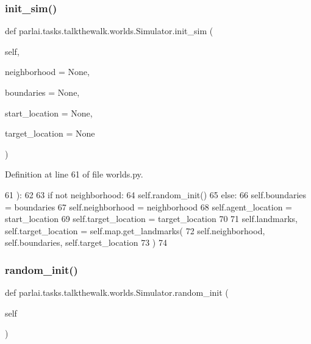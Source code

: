 \subsubsection{\texorpdfstring{init\+\_\+sim()}{init\_sim()}}
{\footnotesize\ttfamily def parlai.\+tasks.\+talkthewalk.\+worlds.\+Simulator.\+init\+\_\+sim (\begin{DoxyParamCaption}\item[{}]{self,  }\item[{}]{neighborhood = {\ttfamily None},  }\item[{}]{boundaries = {\ttfamily None},  }\item[{}]{start\+\_\+location = {\ttfamily None},  }\item[{}]{target\+\_\+location = {\ttfamily None} }\end{DoxyParamCaption})}



Definition at line 61 of file worlds.\+py.


\begin{DoxyCode}
61     ):
62 
63         \textcolor{keywordflow}{if} \textcolor{keywordflow}{not} neighborhood:
64             self.random\_init()
65         \textcolor{keywordflow}{else}:
66             self.boundaries = boundaries
67             self.neighborhood = neighborhood
68             self.agent\_location = start\_location
69             self.target\_location = target\_location
70 
71         self.landmarks, self.target\_location = self.map.get\_landmarks(
72             self.neighborhood, self.boundaries, self.target\_location
73         )
74 
\end{DoxyCode}
\mbox{\label{classparlai_1_1tasks_1_1talkthewalk_1_1worlds_1_1Simulator_adde735badb8bd967efbc8e6a71378bac}} 
\subsubsection{\texorpdfstring{random\+\_\+init()}{random\_init()}}
{\footnotesize\ttfamily def parlai.\+tasks.\+talkthewalk.\+worlds.\+Simulator.\+random\+\_\+init (\begin{DoxyParamCaption}\item[{}]{self }\end{DoxyParamCaption})}



